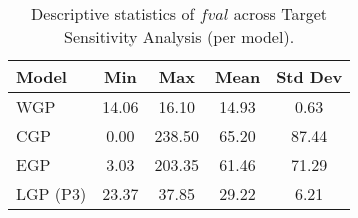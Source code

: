 \begin{table}[htbp]
\centering
\caption{Descriptive statistics of $fval$ across Target Sensitivity Analysis (per model).}
\label{tab:target_sa_stats}
\begin{tabular}{lcccc}
\toprule
Model & Min & Max & Mean & Std Dev \\
\midrule
WGP & 14.06 & 16.10 & 14.93 & 0.63 \\
CGP & 0.00 & 238.50 & 65.20 & 87.44 \\
EGP & 3.03 & 203.35 & 61.46 & 71.29 \\
LGP (P3) & 23.37 & 37.85 & 29.22 & 6.21 \\
\bottomrule
\end{tabular}
\end{table}

